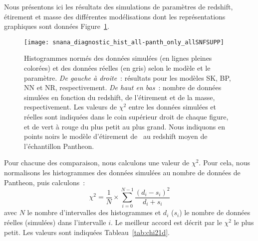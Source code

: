 \documentclass[../main/main.tex]{subfiles}
\begin{document}
Nous présentons ici les résultats des simulations de paramètres de redshift,
étirement et masse des différentes modélisations dont les représentations
graphiques sont données Figure~\ref{fig:hist1d}.

\begin{figure}[ht]
    \centering
    \texttt{[image: snana\_diagnostic\_hist\_all-panth\_only\_allSNFSUPP]}
    \caption[Histogrammes uni-dimensionnels des données simulées et réelles]
        {Histogrammes normés des données simulées (en lignes pleines
        colorées) et des données réelles (en gris) selon le modèle et le
        paramètre. \textit{De gauche à droite}~: résultats pour les modèles SK,
        BP, NN et NR, respectivement. \textit{De haut en bas}~: nombre de
        données simulées en fonction du redshift, de l'étirement et de la masse,
        respectivement. Les valeurs de $\chi^2$ entre les données simulées et
        réelles sont indiquées dans le coin supérieur droit de chaque figure, et
        de vert à rouge du plus petit au plus grand. Nous indiquons en points
        noirs le modèle d'étirement de~ au redshift
        moyen de l'échantillon Pantheon.}
    \label{fig:hist1d}
\end{figure}

Pour chacune des comparaison, nous calculons une valeur de $\chi^2$. Pour cela,
nous normalisons les histogrammes des données simulées au nombre de données de
Pantheon, puis calculons~:
\begin{equation}\label{eq:chi21d}
    \chi^2 = \frac{1}{N}\times\sum_{i=0}^{N-1} \frac{(d_i - s_i)^2}{d_i+s_i}
\end{equation}
avec $N$ le nombre d'intervalles des histogrammes et $d_i$ ($s_i$) le nombre de
données réelles (simulées) dans l'intervalle $i$. Le meilleur accord est décrit
par le $\chi^2$ le plus petit. Les valeurs sont indiquées
Tableau~\ref{tab:chi21d}.
\end{document}
